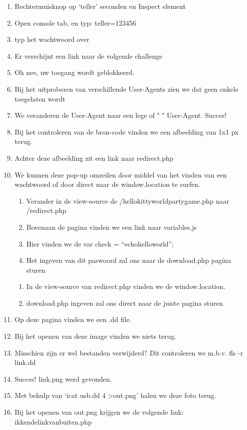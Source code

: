 \begin{enumerate}
\item Rechtermuisknop op `teller' seconden en Inspect element
\item Open console tab, en typ: teller=123456
\item typ het wachtwoord over
\item Er verschijnt een link naar de volgende challenge
\item Oh nee, uw toegang wordt geblokkeerd.
\item Bij het uitproberen van verschillende User-Agents zien we dat geen enkele toegelaten wordt
\item We veranderen de User-Agent naar een lege of " " User-Agent. Succes!
\item Bij het controleren van de bron-code vinden we een afbeelding van 1x1 px terug.
\item Achter deze afbeelding zit een link naar redirect.php
\item We kunnen deze pop-up omzeilen door middel van het vinden van een wachtwoord of door direct naar de window.location te surfen.
\begin{enumerate}
\item Verander in de view-source de /hellokittyworldpartygame.php naar /redirect.php
\item Bovenaan de pagina vinden we een link naar variables.js
\item Hier vinden we de var check = ``echohelloworld'';
\item Het ingeven van dit paswoord zal ons naar de download.php pagina sturen
\end{enumerate}
\begin{enumerate}
\item In de view-source van redirect.php vinden we de window.location.
\item download.php ingeven zal ons direct naar de juiste pagina sturen
\end{enumerate}
\item Op deze pagina vinden we een .dd file.
\item Bij het openen van deze image vinden we niets terug.
\item Misschien zijn er wel bestanden verwijderd? Dit controleren we m.b.v. fls -r link.dd
\item Succes! link.png werd gevonden.
\item Met behulp van `icat usb.dd 4 \textgreater out.png' halen we deze foto terug.
\item Bij het openen van out.png krijgen we de volgende link: ikkendelinkvanbuiten.php

\end{enumerate}
